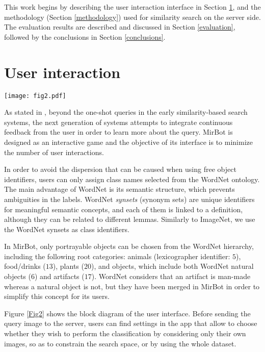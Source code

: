 \documentclass[final, twocolumn]{elsarticle}
\begin{document}
This work begins by describing the user interaction interface in Section \ref{interaction}, and the methodology (Section \ref{methodology}) used for similarity search on the server side. The evaluation results are described and discussed in Section \ref{evaluation}, followed by the conclusions in Section \ref{conclusions}.



\section{User interaction}
\label{interaction}

\begin{figure*}
\center
\texttt{[image: fig2.pdf]}
\caption{\label{Fig2} Diagram of the MirBot interface. The path from \texttt{Server} (after ROI selection) to \texttt{Server} corresponds to the user validation process. }
\end{figure*}

As stated in \cite{Lew2006Content-basedChallenges}, beyond the one-shot queries in the early similarity-based search systems, the next generation of systems attempts to integrate continuous feedback from the user in order to learn more about the query. MirBot is designed as an interactive game and the objective of its interface is to minimize the number of user interactions. 

In order to avoid the dispersion that can be caused when using free object identifiers, users can only assign class names selected from the WordNet ontology. The main advantage of WordNet is its semantic structure, which prevents ambiguities in the labels. WordNet \textit{synsets} (synonym sets) are unique identifiers for meaningful semantic concepts, and each of them is linked to a definition, although they can be related to different lemmas. Similarly to ImageNet, we use the WordNet synsets as class identifiers.

In MirBot, only portrayable objects can be chosen from the WordNet hierarchy, including the following root categories: animals (lexicographer identifier: $5$), food/drinks ($13$), plants ($20$), and objects, which include both WordNet natural objects ($6$) and artifacts ($17$). WordNet considers that an artifact is man-made whereas a natural object is not, but they have been merged in MirBot in order to simplify this concept for its users. 

Figure \ref{Fig2} shows the block diagram of the user interface. Before sending the query image to the server, users can find settings in the app that allow to choose whether they wish to perform the classification by considering only their own images, so as to constrain the search space, or by using the whole dataset.  
\end{document}

